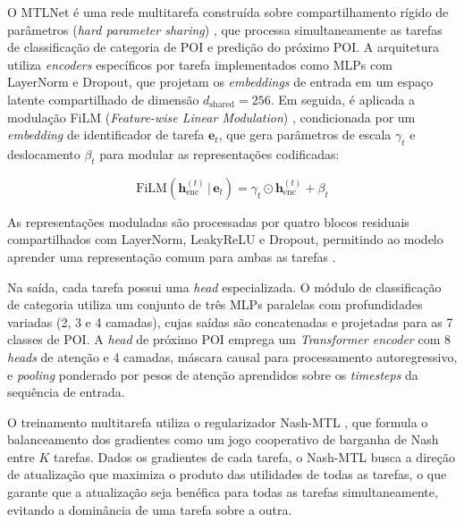 O MTLNet \cite{silva2025mtlnet} é uma rede multitarefa construída sobre compartilhamento rígido de parâmetros (\textit{hard parameter sharing}) \cite{caruana1997multitask}, que processa simultaneamente as tarefas de classificação de categoria de POI e predição do próximo POI. A arquitetura utiliza \textit{encoders} específicos por tarefa implementados como MLPs com LayerNorm e Dropout, que projetam os \textit{embeddings} de entrada em um espaço latente compartilhado de dimensão $d_{\mathrm{shared}} = 256$. Em seguida, é aplicada a modulação FiLM (\textit{Feature-wise Linear Modulation}) \cite{perez2018film}, condicionada por um \textit{embedding} de identificador de tarefa $\mathbf{e}_{t}$, que gera parâmetros de escala $\gamma_{t}$ e deslocamento $\beta_{t}$ para modular as representações codificadas:

\begin{equation}
\mathrm{FiLM}(\mathbf{h}_{\mathrm{enc}}^{(t)} \,|\, \mathbf{e}_{t}) = \gamma_{t} \odot \mathbf{h}_{\mathrm{enc}}^{(t)} + \beta_{t}
\label{eq:film}
\end{equation}

As representações moduladas são processadas por quatro blocos residuais compartilhados com LayerNorm, LeakyReLU e Dropout, permitindo ao modelo aprender uma representação comum para ambas as tarefas \cite{baxter2000model}.

Na saída, cada tarefa possui uma \textit{head} especializada. O módulo de classificação de categoria utiliza um conjunto de três MLPs paralelas com profundidades variadas (2, 3 e 4 camadas), cujas saídas são concatenadas e projetadas para as 7 classes de POI. A \textit{head} de próximo POI emprega um \textit{Transformer encoder} com 8 \textit{heads} de atenção e 4 camadas, máscara causal para processamento autoregressivo, e \textit{pooling} ponderado por pesos de atenção aprendidos sobre os \textit{timesteps} da sequência de entrada. %

O treinamento multitarefa utiliza o regularizador Nash-MTL \cite{nash}, que formula o balanceamento dos gradientes como um jogo cooperativo de barganha de Nash entre $K$ tarefas. Dados os gradientes de cada tarefa, o Nash-MTL busca a direção de atualização que maximiza o produto das utilidades de todas as tarefas, o que garante que a atualização seja benéfica para todas as tarefas simultaneamente, evitando a dominância de uma tarefa sobre a outra.



